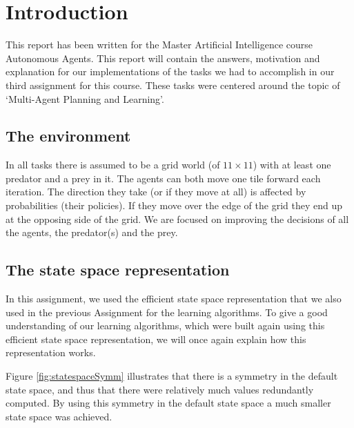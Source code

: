 
\section{Introduction}
This report has been written for the Master Artificial Intelligence course Autonomous Agents. This report will contain the answers, motivation and explanation for our implementations of the tasks we had to accomplish in our third assignment for this course. These tasks were centered around the topic of `Multi-Agent Planning and Learning'.

\subsection{The environment} \label{sec:environment}
In all tasks there is assumed to be a grid world (of $11 \times 11$) with at least one predator and a prey in it. The agents can both move one tile forward each iteration. The direction they take (or if they move at all) is affected by probabilities (their policies). If they move over the edge of the grid they end up at the opposing side of the grid. We are focused on improving the decisions of all the agents, the predator(s) and the prey. 

\subsection{The state space representation} \label{sec:stateSpaceIntro}
In this assignment, we used the efficient state space representation that we also used in the previous Assignment for the learning algorithms. To give a good understanding of our learning algorithms, which were built again using this efficient state space representation, we will once again explain how this representation works.

Figure \ref{fig:statespaceSymm} illustrates that there is a symmetry in the default state space, and thus that there were relatively much values redundantly computed.
By using this symmetry in the default state space a much smaller state space was achieved. 

